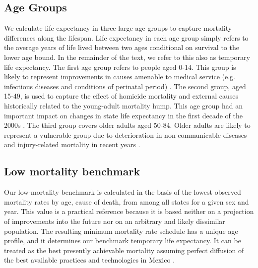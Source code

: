 \documentclass{bmcart}
\begin{document}




\subsection*{Age Groups}

We calculate life expectancy in three large age groups to capture mortality differences along the lifespan. Life expectancy in each age group simply refers to the average years of life lived between two ages conditional on survival to the lower age bound. In the remainder of the text, we refer to this also as temporary life expectancy. The first age group refers to people aged 0-14. This group is likely to represent improvements in causes amenable to medical service (e.g. infectious diseases and conditions of perinatal period) \cite{canudas2014}. The second group, aged 15-49, is used to capture the effect of homicide mortality and external causes historically related to the young-adult mortality hump. This age group had an important impact on changes in state life expectancy in the first decade of the 2000s \cite{Aburto2015}. The third group covers older adults aged 50-84. Older adults are likely to represent a vulnerable group due to deterioration in non-communicable diseases and injury-related mortality in recent years \cite{gonzalez2011health,gomez2016dissonant}.

\subsection*{Low mortality benchmark}
Our low-mortality benchmark is calculated in the basis of the lowest observed mortality rates by age, cause of death, from among all states for a given sex and year. This value is a practical reference because it is based neither on a projection of improvements into the future nor on an arbitrary and likely dissimilar population.  The resulting minimum mortality rate schedule has a unique age profile, and it determines our benchmark temporary life expectancy. It can be treated as the best presently achievable mortality assuming perfect diffusion of the best available practices and technologies in Mexico \cite{vallin2008minimum}. 
\end{document}

